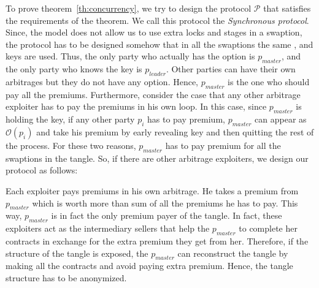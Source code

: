 
To prove theorem~\ref{th:concurrency}, we try to design the protocol $\mathcal{P}$ that satisfies the requirements of the theorem. We call this protocol the \emph{Synchronous protocol}.
Since, the model does not allow us to use extra locks and stages in a swaption, the protocol has to be designed somehow that in all the swaptions the same \Aone, \keyone and \Atwo keys are used. Thus, the only party who actually has the option is $p_{master}$, and the only party who knows the \keyone key is $p_{leader}$. Other parties can have their own arbitrages but they do not have any option. Hence, $p_{master}$ is the one who should pay all the premiums. Furthermore, consider the case that any other arbitrage exploiter has to pay the premiums in his own loop. In this case, since $p_{master}$ is holding the \Aone key, if any other party $p_i$ has to pay premium, $p_{master}$ can appear as $\mathcal{O}(p_i)$ and take his premium by early revealing \Aone key and then quitting the rest of the process. For these two reasons, $p_{master}$ has to pay premium for all the swaptions in the tangle. So, if there are other arbitrage exploiters, we design our protocol as follows: 

Each exploiter pays premiums in his own arbitrage. He takes a premium from $p_{master}$ which is worth more than sum of all the premiums he has to pay. This way, $p_{master}$ is in fact the only premium payer of the tangle. In fact, these exploiters act as the intermediary sellers that help the $p_{master}$ to complete her contracts in exchange for the extra premium they get from her. Therefore, if the structure of the tangle is exposed, the $p_{master}$ can reconstruct the tangle by making all the contracts and avoid paying extra premium. Hence, the tangle structure has to be anonymized.



